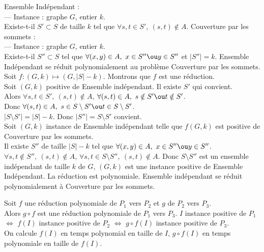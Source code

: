 \documentclass[french, 11pt]{article}
\begin{document}
\begin{ex}{}{}
    Ensemble Indépendant :\\
    --- Instance : graphe $G$, entier $k$.\\
    Existe-t-il $S'\subset S$ de taille $k$ tel que $\forall s,t \in S', ~ (s,t)\notin A$.\n
    Couverture par les sommets :\\
    --- Instance : graphe $G$, entier $k$.\\
    Existe-t-il $S''\subset S$ tel que $\forall (x,y) \in A, ~ x \in S'' \ou y \in S''$ et $|S''|=k$.\n
    Ensemble Indépendant se réduit polynomialement au problème Couverture par les sommets.
    \tcblower
    \boxed{\ra} Soit $f:(G,k)\mapsto (G,|S|-k)$. Montrons que $f$ est une réduction.\\
    Soit $(G,k)$ positive de Ensemble indépendant. Il existe $S'$ qui convient.\\
    Alors $\forall s,t \in S', ~ (s,t) \notin A$, $\forall (s,t) \in A, ~ s\notin S' \ou t \notin S'$.\\
    Donc $\forall (s,t) \in A, ~ s \in S \setminus S' \ou t \in S \setminus S'$.\\
    $|S\setminus S'| = |S| - k$. Donc $|S''|=S\setminus S'$ convient.\\
    \boxed{\la} Soit $(G,k)$ instance de Ensemble indépendant telle que $f(G,k)$ est positive de Couverture par les sommets.\\
    Il existe $S''$ de taille $|S|-k$ tel que $\forall (x,y) \in A, ~ x\in S'' \ou y \in S''$.\\
    $\forall s,t \notin S'', ~ (s,t)\notin A$, $\forall s,t \in S\setminus S'', ~ (s,t)\notin A$. Donc $S\setminus S''$ est un ensemble indépendant de taille $k$ de $G$, $(G,k)$ est une instance positive de Ensemble Indépendant.
    La réduction est polynomiale. Ensemble indépendant se réduit polynomialement à Couverture par les sommets.
\end{ex}

\begin{prop}{}{}
    Soit $f$ une réduction polynomiale de $P_1$ vers $P_2$ et $g$ de $P_2$ vers $P_3$.\\
    Alors $g\circ f$ est une réduction polynomiale de $P_1$ vers $P_3$.
    \tcblower
    $I$ instance positive de $P_1$ $\iff$ $f(I)$ instance positive de $P_2$ $\iff$ $g\circ f(I)$ instance positive de $P_3$.\\
    On calcule $f(I)$ en temps polynomial en taille de $I$, $g\circ f(I)$ en temps polynomiale en taille de $f(I)$.
\end{prop}
\end{document}
